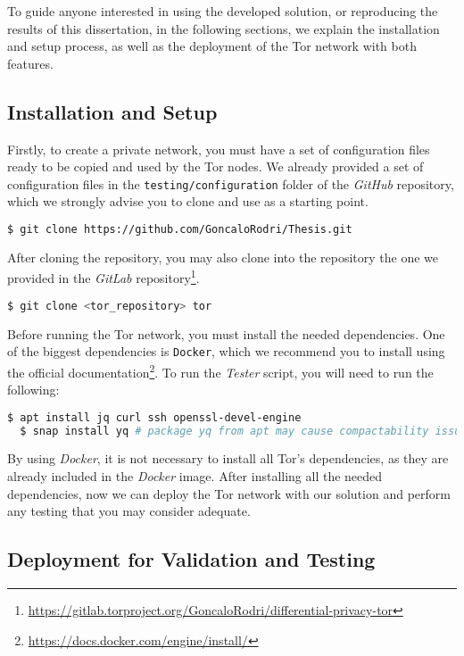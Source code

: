 To guide anyone interested in using the developed solution, or reproducing the results of this dissertation, in the following sections, we explain the installation and setup process, as well as the deployment of the Tor network with both features.


\subsection{Installation and Setup}\label{subsec:installation_and_setup}

Firstly, to create a private network, you must have a set of configuration files ready to be copied and used by the Tor nodes. We already provided a set of configuration files in the \texttt{testing/configuration} folder of the \textit{GitHub} repository, which we strongly advise you to clone and use as a starting point. 
\begin{lstlisting}[language=bash]
  $ git clone https://github.com/GoncaloRodri/Thesis.git
\end{lstlisting}

After cloning the repository, you may also clone into the repository the one we provided in the \textit{GitLab} repository\footnote{\url{https://gitlab.torproject.org/GoncaloRodri/differential-privacy-tor}}.
\begin{lstlisting}[language=bash]
  $ git clone <tor_repository> tor
\end{lstlisting}

Before running the Tor network, you must install the needed dependencies. One of the biggest dependencies is \texttt{Docker}, which we recommend you to install using the official documentation\footnote{\url{https://docs.docker.com/engine/install/}}. To run the \textit{Tester} script, you will need to run the following:
\begin{lstlisting}[language=bash]
  $ apt install jq curl ssh openssl-devel-engine
  $ snap install yq # package yq from apt may cause compactability issues
\end{lstlisting}

By using \textit{Docker}, it is not necessary to install all Tor's dependencies, as they are already included in the \textit{Docker} image. After installing all the needed dependencies, now we can deploy the Tor network with our solution and perform any testing that you may consider adequate.

\subsection{Deployment for Validation and Testing}\label{subsec:deployment_for_validation_and_testing}


